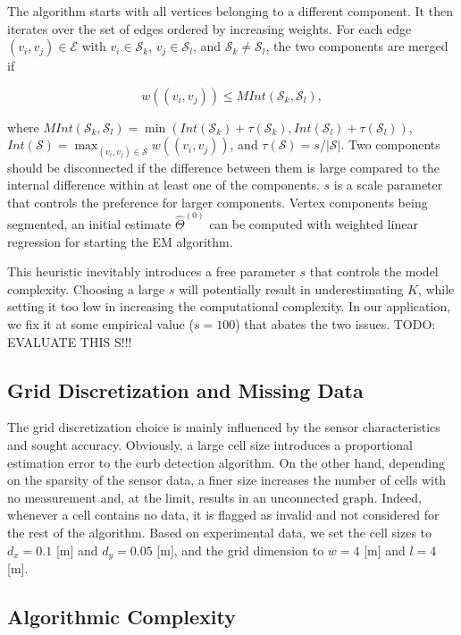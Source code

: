 The algorithm starts with all vertices belonging to a different component. It
then iterates over the set of edges ordered by increasing weights. For each
edge $(v_i,v_j)\in\mathcal{E}$ with $v_i\in\mathcal{S}_k$,
$v_j\in\mathcal{S}_l$, and $\mathcal{S}_k\neq\mathcal{S}_l$, the two components
are merged if

\begin{equation}
\label{eqn:merge}
w((v_i,v_j))\leq MInt(\mathcal{S}_k, \mathcal{S}_l),
\end{equation}

where $MInt(\mathcal{S}_k,\mathcal{S}_l)=\min(Int(\mathcal{S}_k)+
\tau(\mathcal{S}_k),Int(\mathcal{S}_l)+\tau(\mathcal{S}_l))$,
$Int(\mathcal{S})=\max_{(v_i,v_j)\in\mathcal{S}} w((v_i,v_j))$, and
$\tau(\mathcal{S})=s/|\mathcal{S}|$. Two components should be disconnected if
the difference between them is large compared to the internal difference within
at least one of the components. $s$ is a scale parameter that controls the
preference for larger components. Vertex components being segmented, an initial
estimate $\hat{\Theta}^{(0)}$ can be computed with weighted linear regression
for starting the EM algorithm.

This heuristic inevitably introduces a free parameter $s$ that controls the
model complexity. Choosing a large $s$ will potentially result in
underestimating $K$, while setting it too low in increasing the computational
complexity. In our application, we fix it at some empirical value ($s=100$) that
abates the two issues. TODO: EVALUATE THIS S!!!

\subsection{Grid Discretization and Missing Data}

The grid discretization choice is mainly influenced by the sensor
characteristics and sought accuracy. Obviously, a large cell size introduces
a proportional estimation error to the curb detection algorithm. On the other
hand, depending on the sparsity of the sensor data, a finer size increases the
number of cells with no measurement and, at the limit, results in an unconnected
graph. Indeed, whenever a cell contains no data, it is flagged as invalid and
not considered for the rest of the algorithm. Based on experimental data, we
set the cell sizes to $d_x=0.1$ [m] and $d_y=0.05$ [m], and the grid dimension
to $w=4$ [m] and $l=4$ [m].

\subsection{Algorithmic Complexity}

